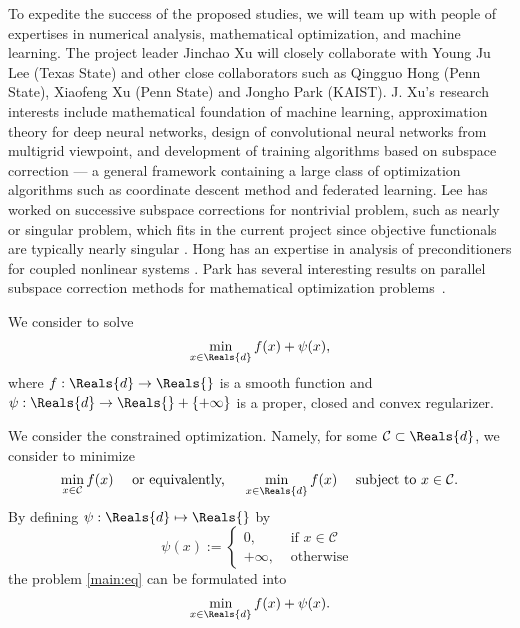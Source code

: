 \begin{itemize}
To expedite the success of the proposed studies, we will team up with people of expertises in numerical analysis, mathematical optimization, and machine learning. The project leader Jinchao Xu will closely collaborate with Young Ju Lee (Texas State) and other close collaborators such as Qingguo Hong (Penn State), Xiaofeng Xu (Penn State) and Jongho Park (KAIST).  J. Xu's research interests include mathematical foundation of machine learning,  approximation theory for deep neural networks, design of convolutional neural networks from multigrid viewpoint, and development of training algorithms based on subspace correction --- a general framework containing a large class of optimization algorithms such as coordinate descent method and federated learning. Lee has worked on successive subspace corrections for nontrivial problem, such as nearly or singular problem, which fits in the current project since objective functionals are typically nearly singular \cite{chen2020robust,lee2009robust,LWXZ:2007}. Hong has an expertise in analysis of preconditioners for coupled nonlinear systems \cite{hong2016uniformly,hong2016robust,chen2020robust}. 
Park has several interesting results on parallel subspace correction methods for mathematical optimization problems~\cite{Park:2020,Park:2021,Park:2022}.



We consider to solve 
\begin{equation} 
\min_{x \in \Reals{d}} f(x) + \psi(x), 
\end{equation}
where $f : \Reals{d} \rightarrow \Reals{}$ is a smooth function and $\psi : \Reals{d} \rightarrow \Reals{} + \{+\infty\}$ is a proper, closed and convex regularizer. 

We consider the constrained optimization. Namely, for some $\mathcal{C} \subset \Reals{d}$, we consider to minimize  
\begin{equation}\label{main:eq}  
\min_{x \in \mathcal{C}} f(x) \quad \mbox{ or equivalently, } \quad \min_{x \in \Reals{d}} f(x) \quad \mbox{ subject to } x \in \mathcal{C}.  
\end{equation}
By defining $\psi : \Reals{d} \mapsto \Reals{}$ by 
\begin{equation}
\psi(x) :=  \left \{ \begin{array}{cc} 
0, & \mbox{ if } x \in \mathcal{C} \\
+\infty, & \mbox{ otherwise } 
\end{array} \right . 
\end{equation}
the problem \eqref{main:eq} can be formulated into 
\begin{equation} 
\min_{x \in \Reals{d}} f(x) + \psi(x).  
\end{equation}


\end{itemize}
